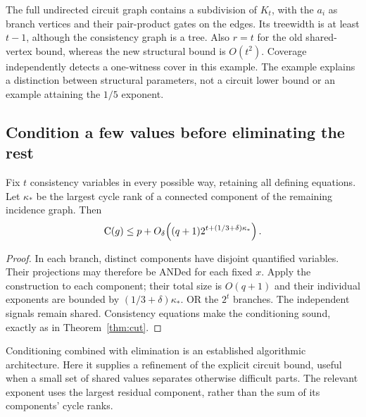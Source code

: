 The full undirected circuit graph contains a subdivision of $K_t$,
with the $a_i$ as branch vertices and their pair-product gates on
the edges. Its treewidth is at least $t-1$, although the consistency
graph is a tree. Also $r=t$ for the old shared-vertex bound, whereas
the new structural bound is $O(t^2)$. Coverage independently detects
a one-witness cover in this example. The example explains a distinction
between structural parameters, not a circuit lower bound or an example
attaining the $1/5$ exponent.

\subsection{Condition a few values before eliminating the rest}

\begin{corollary}
\label{cor:condition-cycles}
Fix $t$ consistency variables in every possible way, retaining all
defining equations. Let $\kappa_*$ be the largest cycle rank of a
connected component of the remaining incidence graph. Then
\[
 \mathrm{C}(g)\le p+O_\delta\!\left((q+1)
                  2^{t+(1/3+\delta)\kappa_*}\right).
\]
\end{corollary}
\begin{proof}
In each branch, distinct components have disjoint quantified variables.
Their projections may therefore be ANDed for each fixed $x$. Apply the
construction to each component; their total size is $O(q+1)$ and their
individual exponents are bounded by $(1/3+\delta)\kappa_*$. OR the
$2^t$ branches. The independent signals remain shared. Consistency
equations make the conditioning sound, exactly as in Theorem~\ref{thm:cut}.
\end{proof}

Conditioning combined with elimination is an established algorithmic
architecture. Here it supplies a refinement of the explicit circuit
bound, useful when a small set of shared values separates otherwise
difficult parts. The relevant exponent uses the largest residual
component, rather than the sum of its components' cycle ranks.


